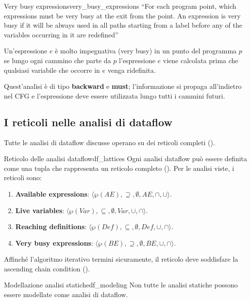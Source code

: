\begin{definizione}{Very busy expressions}{very_busy_expressions}
``For each program point, which expressions must be very busy at the exit
from the point. An expression is very busy if it will be always used in all
paths starting from a label before any of the variables occurring in it are
redefined''

Un'espressione $e$ è molto impegnativa (very busy) in un punto del programma
$p$ se lungo ogni cammino che parte da $p$ l'espressione $e$ viene
calcolata prima che qualsiasi variabile che occorre in $e$ venga ridefinita.

Quest'analisi è di tipo \textbf{backward} e \textbf{must}; l'informazione
si propaga all'indietro nel CFG e l'espressione deve essere utilizzata lungo
tutti i cammini futuri.
\end{definizione}

\subsection{I reticoli nelle analisi di dataflow}

Tutte le analisi di dataflow discusse operano su dei reticoli completi
().

\begin{definizione}{Reticolo delle analisi dataflow}{df_lattices}
Ogni analisi dataflow può essere definita come una tupla che rappresenta un
reticolo completo ().
Per le analisi viste, i reticoli sono:
\begin{enumerate}
    \item \textbf{Available expressions}: $\langle \wp(AE), \supseteq, \emptyset, AE, \cap, \cup \rangle$.
    \item \textbf{Live variables}: $\langle \wp(Var), \subseteq, \emptyset, Var, \cup, \cap \rangle$.
    \item \textbf{Reaching definitions}: $\langle \wp(Def), \subseteq, \emptyset, Def, \cup, \cap \rangle$.
    \item \textbf{Very busy expressions}: $\langle \wp(BE), \supseteq, \emptyset, BE, \cup, \cap \rangle$.
\end{enumerate}

Affinché l'algoritmo iterativo termini sicuramente, il reticolo deve soddisfare
la ascending chain condition ().
\end{definizione}

\begin{nota}{Modellazione analisi statiche}{df_modeling}
Non tutte le analisi statiche possono essere modellate come analisi di dataflow.
\end{nota}

